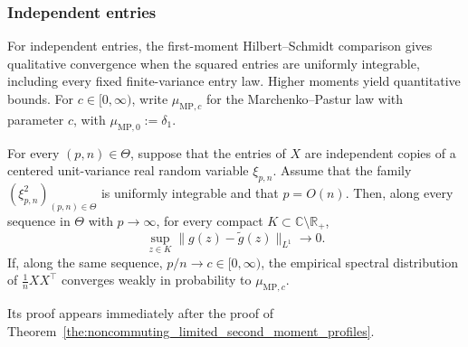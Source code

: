 \documentclass[EJP, preprint, NODS, nobera, nofontexpansion]{ejpecp}
\begin{document}
\subsubsection{Independent entries}
For independent entries, the first-moment Hilbert--Schmidt
comparison gives qualitative convergence when the squared
entries are uniformly integrable, including every fixed
finite-variance entry law. Higher moments yield quantitative
bounds.
For $c\in[0,\infty)$, write $\mu_{\mathrm{MP},c}$ for the
Marchenko--Pastur law with parameter $c$, with
$\mu_{\mathrm{MP},0}:=\delta_1$.

\begin{corollary}
\label{cor:mp_iid_finite_variance}
For every $(p,n)\in\Theta$, suppose that the entries of $X$ are
independent copies of a centered unit-variance real random variable
$\xi_{p,n}$. Assume that the family $(\xi_{p,n}^2)_{(p,n)\in\Theta}$
is uniformly integrable and that $p=O(n)$.
Then, along every sequence in $\Theta$ with
$p\to\infty$, for every compact $K\subset\mathbb C\setminus\mathbb R_+$,
\[
    \sup_{z\in K}\|g(z)-\tilde g(z)\|_{L^1}\longrightarrow0.
\]
If, along the same sequence, $p/n\to c\in[0,\infty)$, the empirical
spectral distribution of $\frac1n XX^\top$ converges weakly in probability
to $\mu_{\mathrm{MP},c}$.
\end{corollary}

Its proof appears immediately after the proof of
Theorem~\ref{the:noncommuting_limited_second_moment_profiles}.
\end{document}
